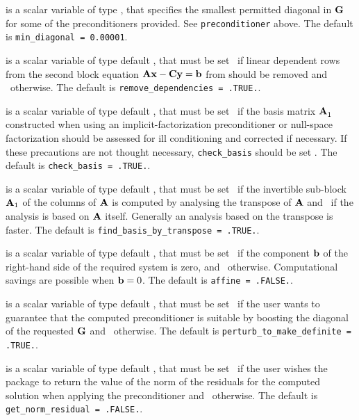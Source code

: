 \documentclass{galahad}
\begin{document}
\begin{description}


 is a scalar variable of type \realdp,
that specifies the smallest permitted diagonal in ${\mathbf{G}}$ for some
of the preconditioners provided. See {\tt preconditioner} above.
The default is {\tt min\_diagonal = 0.00001}.

 is a scalar variable of type default \logical,
that must be set \true\ if linear dependent rows from the second
block equation ${\mathbf{A}} {\mathbf{x}} - {\mathbf{C}} {\mathbf{y}} = {\mathbf{b}}$ from 
should be removed and \false\ otherwise.
The default is {\tt remove\_dependencies = .TRUE.}.

 is a scalar variable of type default \logical,
that must be set \true\ if the basis matrix ${\mathbf{A}}_{1}^{}$ constructed
when using an implicit-factorization preconditioner or null-space factorization
should be assessed for ill conditioning and corrected if necessary. If these
precautions are not thought necessary, {\tt check\_basis} should be
set \false. The default is {\tt check\_basis = .TRUE.}.

 is a scalar variable of type default \logical,
that must be set \true\ if the invertible sub-block ${\mathbf{A}}_1$ of the
columns of ${\mathbf{A}}$ is computed by analysing the transpose of ${\mathbf{A}}$
and \false\ if the analysis is based on ${\mathbf{A}}$ itself. Generally
an analysis based on the transpose is faster.
The default is {\tt find\_basis\_by\_transpose = .TRUE.}.

 is a scalar variable of type default \logical,
that must be set \true\ if the component ${\mathbf{b}}$ of the right-hand side
of the required system  is zero, and \false\ otherwise.
Computational savings are possible when ${\mathbf{b}} = 0$.
The default is {\tt affine = .FALSE.}.

 is a scalar variable of type default \logical,
that must be set \true\ if the user wants to guarantee that the
computed preconditioner is suitable by boosting the diagonal of the
requested ${\mathbf{G}}$ and \false\ otherwise.
The default is {\tt perturb\_to\_make\_definite = .TRUE.}.

 is a scalar variable of type default \logical,
that must be set \true\ if the user wishes the package to return
the value of the norm of the residuals for the computed solution
when applying the preconditioner and  \false\ otherwise.
The default is {\tt get\_norm\_residual = .FALSE.}.


\end{description}
\end{document}
